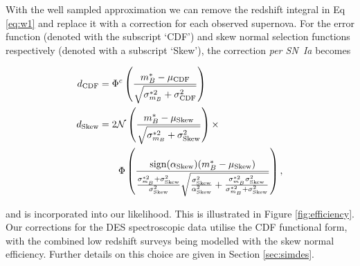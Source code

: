 \documentclass[a4paper,fleqn,usenatbib]{mnras}
\begin{document}
With the well sampled approximation we can remove the redshift integral in Eq \eqref{eq:w1} and replace it with a correction for each observed supernova. For the error function (denoted with the subscript `CDF') and skew normal selection functions respectively (denoted with a subscript `Skew'), the correction \textit{per SN~Ia} becomes

\begin{align}
d_{\rm CDF} &= \Phi^c\left(  \frac{m^*_B - \mu_{\rm CDF}}{\sqrt{\sigma^{*2}_{m_B} + \sigma_{\rm CDF}^2}}  \right) \label{eq:seldes}\\
d_{\rm Skew} &= 2\mathcal{N}\left( \frac{m_B^* - \mu_{\rm Skew}}{\sqrt{\sigma^{*2}_{m_B} + \sigma_{\rm Skew}^2}}\right) \times \notag\\
&\quad\quad \Phi\left(  \frac{{\rm sign}(\alpha_{\rm Skew})(m_B^* - \mu_{\rm Skew})}{\frac{\sigma_{m_B}^{*2} + \sigma^2_{\rm Skew}}{\sigma^2_{\rm Skew}} \sqrt{\frac{\sigma^2_{\rm Skew}}{\alpha^2_{\rm Skew}} + \frac{\sigma_{m_B}^{*2} \sigma^2_{\rm Skew}}{\sigma_{m_B}^{*2} + \sigma^2_{\rm Skew}}} }\right), \label{eq:sellow-$z$}
\end{align}

and is incorporated into our likelihood. This is illustrated in Figure \ref{fig:efficiency}. Our corrections for the DES spectroscopic data utilise the CDF functional form, with the combined low redshift surveys being modelled with the skew normal efficiency. Further details on this choice are given in Section \ref{sec:simdes}.
\end{document}
